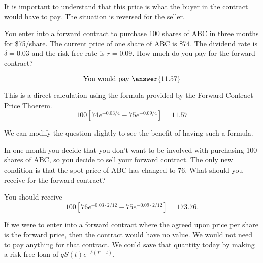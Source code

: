 \documentclass{ximera}
\begin{document}
\begin{remark}
It is important to understand that this price is what the buyer in the contract would have to pay. The situation is reversed for the seller.
\end{remark}

\begin{question}
You enter into a forward contract to purchase 100 shares of ABC in three months for \$75/share. The current price of one share of ABC is \$74. The dividend rate is $\delta=0.03$ and the risk-free rate is $r=0.09$. How much do you pay for the forward contract?
	\begin{prompt}
		\begin{equation*}
		\text{You would pay }\answer{11.57}
		\end{equation*}
	\end{prompt}
\end{question}

\begin{solution}
	This is a direct calculation using the formula provided by the Forward Contract Price Thoerem. 
	\begin{equation*}
	100[74e^{-0.03/4}-75e^{-0.09/4}]=11.57
	\end{equation*}
\end{solution}	

We can modify the question slightly to see the benefit of having such a formula.

\begin{example}
In one month you decide that you don't want to be involved with purchasing 100 shares of ABC, so you decide to sell your forward contract. The only new condition is that the spot price of ABC has changed to 76. What should you receive for the forward contract?
\end{example}

\begin{solution}	
You should receive
	\begin{equation*}
	100[76e^{-0.03\cdot 2/12}-75e^{-0.09\cdot 2/12}]=173.76.
	\end{equation*}
\end{solution}

\begin{remark}
If we were to enter into a forward contract where the agreed upon price per share is the forward price, then the contract would have no value. We would not need to pay anything for that contract. We could save that quantity today by making a risk-free loan of $qS(t)e^{-\delta (T-t)}$. 
\end{remark}
\end{document}
